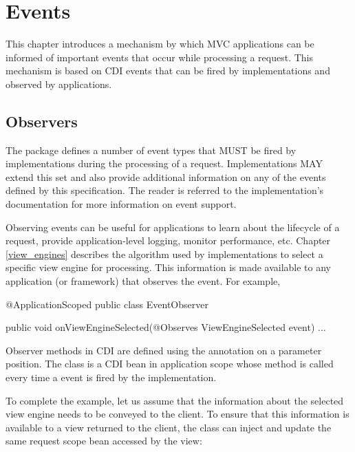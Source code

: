 \chapter{Events}
\label{events}

This chapter introduces a mechanism by which MVC applications can be informed 
of important events that occur while processing a request. This mechanism 
is based on CDI events that can be fired by implementations and observed by 
applications.

\section{Observers}
\label{observers}

The package  defines a number of event types that MUST be 
fired by implementations during the processing of a request. Implementations MAY
extend this set and also provide additional information on any of the events defined
by this specification. The reader is referred to the implementation's documentation
for more information on event support.

Observing events can be useful for applications to learn about the lifecycle of a 
request, provide application-level logging, monitor performance, etc. Chapter 
\ref{view_engines} describes the algorithm used by implementations to select a
specific view engine for processing. This information is made available to any
application (or framework) that observes the  event. For
example,

\begin{listing}{1}
@ApplicationScoped
public class EventObserver {

    public void onViewEngineSelected(@Observes ViewEngineSelected event) {
        ...
    }
}
\end{listing}

Observer methods in CDI are defined using the  annotation on 
a parameter position.
The class  is a CDI bean in application scope whose method
 is called every time a  event
is fired by the implementation. 

To complete the example, let us assume that the information about the selected
view engine needs to be conveyed to the client. To ensure that this information
is available to a view returned to the client, the  class
can inject and update the same request scope bean accessed by the view:

